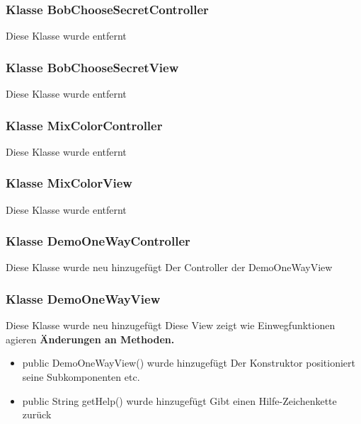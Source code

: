 \documentclass{article}
\begin{document}
	\subsubsection{Klasse BobChooseSecretController}
    Diese Klasse wurde entfernt

	\subsubsection{Klasse BobChooseSecretView}
    Diese Klasse wurde entfernt

	\subsubsection{Klasse MixColorController}
    Diese Klasse wurde entfernt

	\subsubsection{Klasse MixColorView}
    Diese Klasse wurde entfernt

	\subsubsection{Klasse DemoOneWayController}
    Diese Klasse wurde neu hinzugefügt
    Der Controller der DemoOneWayView

	\subsubsection{Klasse DemoOneWayView}
    Diese Klasse wurde neu hinzugefügt
    Diese View zeigt wie Einwegfunktionen agieren
    \textbf{Änderungen an Methoden.}\newline
	   \begin{itemize}
           \item public DemoOneWayView() wurde hinzugefügt\newline
               Der Konstruktor positioniert seine Subkomponenten etc.
           \item public String getHelp() wurde hinzugefügt\newline
               Gibt einen Hilfe-Zeichenkette zurück
           \end{itemize}
\end{document}
